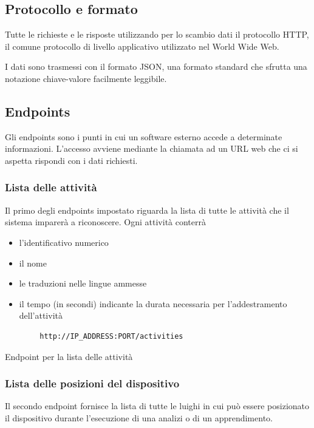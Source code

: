 \subsection{Protocollo e formato}
Tutte le richieste e le risposte utilizzando per lo scambio dati il protocollo HTTP, il comune protocollo di livello 
applicativo utilizzato nel World Wide Web.

I dati sono trasmessi con il formato JSON, una formato standard che sfrutta una notazione chiave-valore facilmente leggibile.


\subsection{Endpoints}
Gli endpoints sono i punti in cui un software esterno accede a determinate informazioni. L'accesso avviene mediante la chiamata ad un URL 
web che ci si aspetta rispondi con i dati richiesti.

\subsubsection{Lista delle attività}
Il primo degli endpoints impostato riguarda la lista di tutte le attività che il sistema imparerà a riconoscere.
Ogni attività conterrà
\begin{itemize}
    \item l'identificativo numerico
    \item il nome
    \item le traduzioni nelle lingue ammesse
    \item il tempo (in secondi) indicante la durata necessaria per l'addestramento dell'attività
\end{itemize}

\begin{listing}[H] 
    \begin{verbatim}
        http://IP_ADDRESS:PORT/activities
    \end{verbatim}
    \caption{Endpoint per la lista delle attività}
\end{listing}

\subsubsection{Lista delle posizioni del dispositivo}
Il secondo endpoint fornisce la lista di tutte le luighi in cui può essere posizionato il dispositivo durante l'esecuzione 
di una analizi o di un apprendimento.

